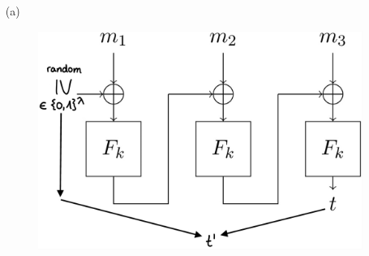 \begin{itemize}
\item[(a)]

\begin{figure}[h]
    \includegraphics[width=\textwidth,height=\textheight,keepaspectratio]{ModKrypt_7-3a.jpg}
    \centering
\end{figure}



\end{itemize}
